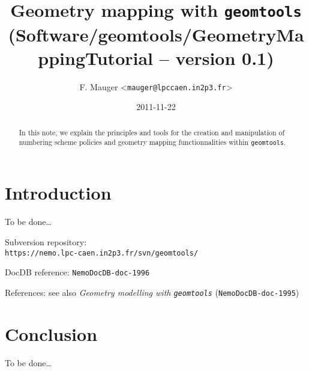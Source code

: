 \documentclass[a4paper,12pt]{article}
\title{Geometry mapping with \texttt{geomtools}\\%
{\small{(Software/geomtools/GeometryMappingTutorial -- version 0.1)}}}
\author{F. Mauger <\texttt{mauger@lpccaen.in2p3.fr}>}
\date{2011-11-22}
\newcommand{\pn}{\par\noindent}
\begin{document}
\maketitle

\begin{abstract}
In this note, we explain the principles and tools
for the creation and manipulation of numbering scheme policies
and geometry mapping functionnalities within \texttt{geomtools}.
\end{abstract}

\tableofcontents

\section{Introduction}

\pn To be done\dots

\vskip 5mm
\pn
Subversion repository:\\
\texttt{https://nemo.lpc-caen.in2p3.fr/svn/geomtools/}
\pn
DocDB reference: \texttt{NemoDocDB-doc-1996}
\pn
References: see also
\textit{Geometry modelling with \texttt{geomtools}} (\texttt{NemoDocDB-doc-1995})
\pagebreak



\pagebreak


\pagebreak


\pagebreak


\pagebreak


\pagebreak
\section{Conclusion}

\pn To be done\dots

\pagebreak
\appendix


\end{document}
